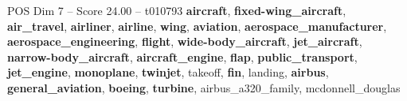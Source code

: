 \begin{textsample}{POS Dim 7 – Score 24.00 – t010793}  \label{ex:f7_pos_009}
\textbf{aircraft}, \textbf{fixed-wing\_aircraft}, \textbf{air\_travel}, \textbf{airliner}, \textbf{airline}, \textbf{wing}, \textbf{aviation}, \textbf{aerospace\_manufacturer}, \textbf{aerospace\_engineering}, \textbf{flight}, \textbf{wide-body\_aircraft}, \textbf{jet\_aircraft}, \textbf{narrow-body\_aircraft}, \textbf{aircraft\_engine}, \textbf{flap}, \textbf{public\_transport}, \textbf{jet\_engine}, \textbf{monoplane}, \textbf{twinjet}, takeoff, \textbf{fin}, landing, \textbf{airbus}, \textbf{general\_aviation}, \textbf{boeing}, \textbf{turbine}, airbus\_a320\_family, mcdonnell\_douglas

\end{textsample}
